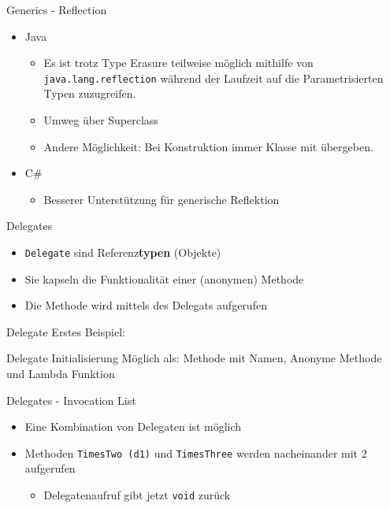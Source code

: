 \documentclass[11pt]{beamer}
\begin{document}
\begin{frame}{Generics - Reflection}
\begin{itemize}
	\item Java 
	\begin{itemize}
		\item Es ist trotz Type Erasure teilweise möglich mithilfe von \texttt{java.lang.reflection} während der Laufzeit auf die Parametrisierten Typen zuzugreifen. 
		\item \glqq Umweg\grqq{} über Superclass
		\item Andere Möglichkeit: Bei Konstruktion immer Klasse mit übergeben.
	\end{itemize}
	\item C\# 
	\begin{itemize}
		\item Besserer Unterstützung für generische Reflektion
	\end{itemize}
\end{itemize}
\end{frame}


\begin{frame}{Delegates}
\begin{itemize}
 	\item \texttt{Delegate} sind Referenz\textbf{typen} (Objekte)
 	\item Sie kapseln die Funktionalität einer (anonymen) Methode
 	\item Die Methode wird mittels des Delegats aufgerufen
\end{itemize}
	
\end{frame}
\begin{frame}{Delegate}
	Erstes Beispiel:
\end{frame}

\begin{frame}{Delegate}
	Initialisierung Möglich als: Methode mit Namen, Anonyme Methode und Lambda Funktion
\end{frame}

\begin{frame}{Delegates - Invocation List}
	\begin{itemize}
		\item  Eine Kombination von Delegaten ist möglich
		\item Methoden \texttt{TimesTwo (d1)} und \texttt{TimesThree} werden nacheinander mit 2 aufgerufen
		\begin{itemize}
			\item Delegatenaufruf gibt jetzt \texttt{void} zurück
		\end{itemize}
	\end{itemize}
\end{frame}
\end{document}
